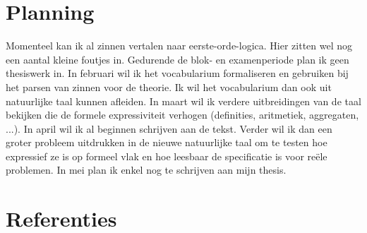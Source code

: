 \documentclass[]{article}
\theoremstyle{definition}
\begin{document}

\section{Planning}
Momenteel kan ik al zinnen vertalen naar eerste-orde-logica. Hier zitten wel nog een aantal kleine foutjes in.
Gedurende de blok- en examenperiode plan ik geen thesiswerk in. In februari wil ik het vocabularium formaliseren en gebruiken bij het parsen van zinnen voor de theorie. Ik wil het vocabularium dan ook uit natuurlijke taal kunnen afleiden. In maart wil ik verdere uitbreidingen van de taal bekijken die de formele expressiviteit verhogen (definities, aritmetiek, aggregaten, ...). In april wil ik al beginnen schrijven aan de tekst. Verder wil ik dan een groter probleem uitdrukken in de nieuwe natuurlijke taal om te testen hoe expressief ze is op formeel vlak en hoe leesbaar de specificatie is voor reële problemen. In mei plan ik enkel nog te schrijven aan mijn thesis.

\pagebreak
\section{Referenties}


\end{document}
